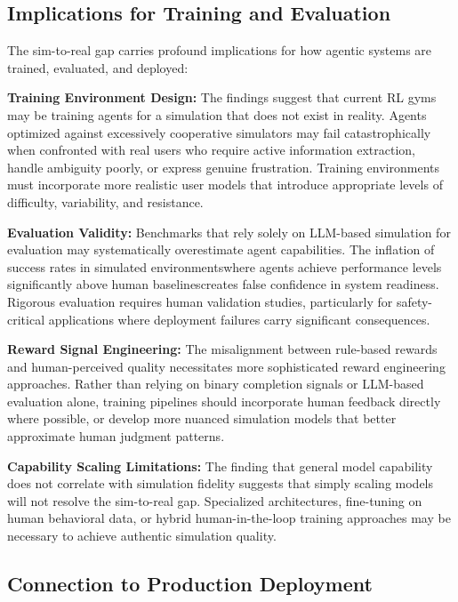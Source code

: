 \subsection{Implications for Training and Evaluation}

The sim-to-real gap carries profound implications for how agentic systems are trained, evaluated, and deployed:

\textbf{Training Environment Design:} The findings suggest that current RL gyms may be training agents for a simulation that does not exist in reality. Agents optimized against excessively cooperative simulators may fail catastrophically when confronted with real users who require active information extraction, handle ambiguity poorly, or express genuine frustration. Training environments must incorporate more realistic user models that introduce appropriate levels of difficulty, variability, and resistance.

\textbf{Evaluation Validity:} Benchmarks that rely solely on LLM-based simulation for evaluation may systematically overestimate agent capabilities. The inflation of success rates in simulated environmentswhere agents achieve performance levels significantly above human baselinescreates false confidence in system readiness. Rigorous evaluation requires human validation studies, particularly for safety-critical applications where deployment failures carry significant consequences.

\textbf{Reward Signal Engineering:} The misalignment between rule-based rewards and human-perceived quality necessitates more sophisticated reward engineering approaches. Rather than relying on binary completion signals or LLM-based evaluation alone, training pipelines should incorporate human feedback directly where possible, or develop more nuanced simulation models that better approximate human judgment patterns.

\textbf{Capability Scaling Limitations:} The finding that general model capability does not correlate with simulation fidelity suggests that simply scaling models will not resolve the sim-to-real gap. Specialized architectures, fine-tuning on human behavioral data, or hybrid human-in-the-loop training approaches may be necessary to achieve authentic simulation quality.

\subsection{Connection to Production Deployment}

